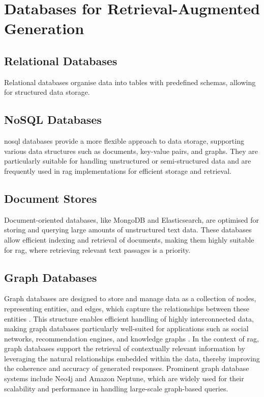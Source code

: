 \section{Databases for Retrieval-Augmented Generation}\label{sec:databases-rag}

\subsection{Relational Databases}\label{sec:relational-databases}
Relational databases organise data into tables with predefined schemas, allowing for structured data storage. 

\subsection{NoSQL Databases}\label{sec:nosql-databases}
\ac{nosql} databases provide a more flexible approach to data storage, supporting various data structures such as documents, key-value pairs, and graphs. 
They are particularly suitable for handling unstructured or semi-structured data and are frequently used in \ac{rag} implementations for efficient storage and retrieval.

\subsection{Document Stores}\label{sec:document-stores}
Document-oriented databases, like MongoDB and Elasticsearch, are optimised for storing and querying large amounts of unstructured text data. 
These databases allow efficient indexing and retrieval of documents, making them highly suitable for \ac{rag}, where retrieving relevant text passages is a priority.
\subsection{Graph Databases}\label{sec:graph-databases}
Graph databases are designed to store and manage data as a collection of nodes, representing entities, and edges, which capture the relationships between these entities \citep{Robinson2015}. This structure enables efficient handling of highly interconnected data, making graph databases particularly well-suited for applications such as social networks, recommendation engines, and knowledge graphs \citep{Angles2008}. In the context of \ac{rag}, graph databases support the retrieval of contextually relevant information by leveraging the natural relationships embedded within the data, thereby improving the coherence and accuracy of generated responses. Prominent graph database systems include Neo4j and Amazon Neptune, which are widely used for their scalability and performance in handling large-scale graph-based queries.

